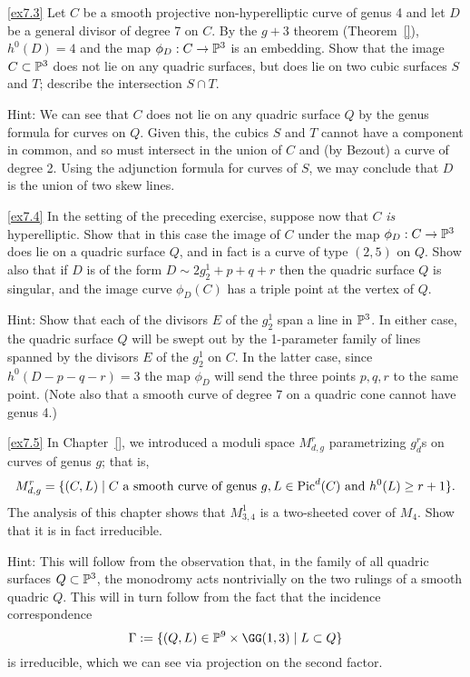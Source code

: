 \begin{exercise}\ref{ex7.3}
Let $C$  be a smooth projective non-hyperelliptic curve of genus 4 and let $D$ be a general divisor of degree 7 on $C$. By the $g+3$ theorem (Theorem~\ref{}), $h^0(D) = 4$ and the map $\phi_D : C \to \PP^3$ is an embedding. Show that the image $C \subset \PP^3$ does not lie on any quadric surfaces, but does lie on two cubic surfaces $S$ and $T$; describe the intersection $S \cap T$.
\end{exercise}

Hint: We can see that $C$ does not lie on any quadric surface $Q$ by the genus formula for curves on $Q$. Given this, the cubics $S$ and $T$ cannot have a component in common, and so must intersect in the union of $C$ and (by Bezout) a curve of degree 2. Using the adjunction formula for curves of $S$, we may conclude that $D$ is the union of two skew lines.

\begin{exercise}\ref{ex7.4}
In the setting of the preceding exercise, suppose now that $C$ \emph{is} hyperelliptic. Show that in this case the image of $C$ under the map $\phi_D : C \to \PP^3$ does lie on a quadric surface $Q$, and in fact is a curve of type $(2,5)$ on $Q$. Show also that if $D$ is of the form $D \sim 2g^1_2 + p + q + r$ then the quadric surface $Q$ is singular, and the image curve $\phi_D(C)$ has a triple point at the vertex of $Q$.
\end{exercise}

Hint: Show that each of the divisors $E$ of the $g^1_2$ span a line in $\PP^3$. In either case, the quadric surface $Q$ will be swept out by the 1-parameter family of lines spanned by the divisors $E$ of the $g^1_2$ on $C$. In the latter case, since $h^0(D-p-q-r) = 3$ the map $\phi_D$ will send the three points $p, q, r$ to the same point. (Note also that a smooth curve of degree 7 on a quadric cone cannot have genus 4.)

\begin{exercise}\ref{ex7.5}
In Chapter~\ref{}, we introduced a moduli space $M^r_{d,g}$ parametrizing $g^r_d$s on curves of genus $g$; that is,
$$
M^r_{d,g} = \{ (C, L) \mid C \text{ a smooth curve of genus } g, L \in \pic^d(C) \text{ and } h^0(L) \geq r+1 \}.
$$
The analysis of this chapter shows that $M^1_{3,4}$ is a two-sheeted cover of $M_4$. Show that it is in fact irreducible.
\end{exercise}

Hint: This will follow from the observation that, in the family of all quadric surfaces $Q \subset \PP^3$, the monodromy acts nontrivially on the two rulings of a smooth quadric $Q$. This will in turn follow from the fact that the incidence correspondence
$$
\Gamma := \{ (Q, L) \in \PP^9 \times \GG(1,3) \mid L \subset Q \}
$$
is irreducible, which we can see via projection on the second factor.

